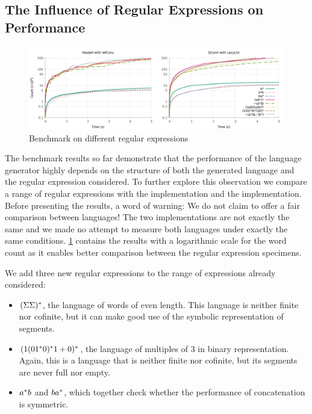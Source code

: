 \subsection{The Influence of Regular Expressions on Performance}
\begin{figure}[!tp]
  \centering
  \includegraphics[width=\linewidth]{measure/langs.png}
  \caption{Benchmark on different regular expressions}
  \label{bench:langs}
\end{figure}

The benchmark results so far demonstrate that the performance of the language
generator highly depends on the structure of both
the generated language and the regular expression considered.
To further explore this observation we compare a range of regular expressions
with the  \haskell implementation and the 
\ocaml implementation.
Before presenting the results, a word of warning:
We do not claim to offer a fair comparison between languages!
The two implementations are not exactly the same and we made no attempt
to measure both languages under exactly the same conditions.
%
\cref{bench:langs} contains the results with a
logarithmic scale for the word count as it enables better comparison
between the regular expression specimens.

We add three new regular expressions to the range of expressions already considered:
\begin{itemize}
\item $(\Sigma\Sigma)^*$, the language of words of even
  length. This language is neither finite nor cofinite, but it can make
  good use of the symbolic representation of segments.
\item $(1 (01^*0)^*1 +{0})^*$, the language
  of multiples of 3 in binary representation. Again, this is a language that is neither
  finite nor cofinite, but its segments are never full nor empty.
\item $a^*b$ and $ba^*$, which together check whether
  the performance of {concatenation} is symmetric.
\end{itemize}

